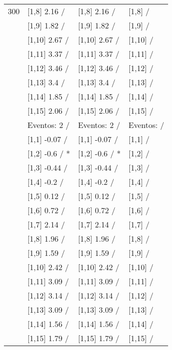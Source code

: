 \begin{table}
\begin{tabular}[t]{llll}
300 & {}[1,8] 2.16  / & {}[1,8] 2.16  / & {}[1,8]  /\\
\addlinespace
 & {}[1,9] 1.82  / & {}[1,9] 1.82  / & {}[1,9]  /\\
 & {}[1,10] 2.67  / & {}[1,10] 2.67  / & {}[1,10]  /\\
 & {}[1,11] 3.37  / & {}[1,11] 3.37  / & {}[1,11]  /\\
 & {}[1,12] 3.46  / & {}[1,12] 3.46  / & {}[1,12]  /\\
 & {}[1,13] 3.4  / & {}[1,13] 3.4  / & {}[1,13]  /\\
\addlinespace
 & {}[1,14] 1.85  / & {}[1,14] 1.85  / & {}[1,14]  /\\
 & {}[1,15] 2.06  / & {}[1,15] 2.06  / & {}[1,15]  /\\
 & Eventos:  2 / & Eventos:  2 / & Eventos:   /\\
 & {}[1,1] -0.07  / & {}[1,1] -0.07  / & {}[1,1]  /\\
 & {}[1,2] -0.6  / * & {}[1,2] -0.6  / * & {}[1,2]  /\\
\addlinespace
 & {}[1,3] -0.44  / & {}[1,3] -0.44  / & {}[1,3]  /\\
 & {}[1,4] -0.2  / & {}[1,4] -0.2  / & {}[1,4]  /\\
 & {}[1,5] 0.12  / & {}[1,5] 0.12  / & {}[1,5]  /\\
 & {}[1,6] 0.72  / & {}[1,6] 0.72  / & {}[1,6]  /\\
 & {}[1,7] 2.14  / & {}[1,7] 2.14  / & {}[1,7]  /\\
\addlinespace
500 & {}[1,8] 1.96  / & {}[1,8] 1.96  / & {}[1,8]  /\\
 & {}[1,9] 1.59  / & {}[1,9] 1.59  / & {}[1,9]  /\\
 & {}[1,10] 2.42  / & {}[1,10] 2.42  / & {}[1,10]  /\\
 & {}[1,11] 3.09  / & {}[1,11] 3.09  / & {}[1,11]  /\\
 & {}[1,12] 3.14  / & {}[1,12] 3.14  / & {}[1,12]  /\\
\addlinespace
 & {}[1,13] 3.09  / & {}[1,13] 3.09  / & {}[1,13]  /\\
 & {}[1,14] 1.56  / & {}[1,14] 1.56  / & {}[1,14]  /\\
 & {}[1,15] 1.79  / & {}[1,15] 1.79  / & {}[1,15]  /\\
\bottomrule
\end{tabular}
\end{table}
